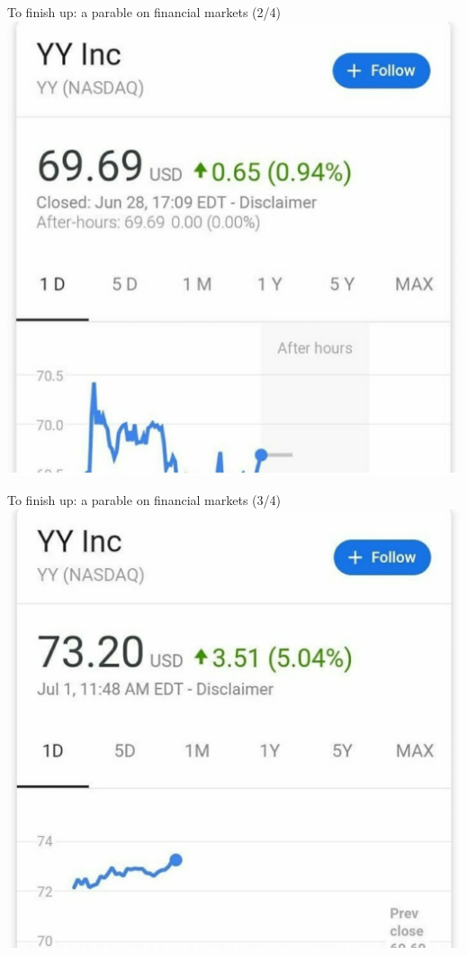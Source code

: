 \documentclass[english,10pt]{beamer}
\theoremstyle{definition}
\begin{document}
\begin{frame}{To finish up: a parable on financial markets (2/4)}
	\centering \includegraphics[width=0.6\paperwidth]{pics/yy2}
\end{frame}


\begin{frame}{To finish up: a parable on financial markets (3/4)}
	\centering \includegraphics[width=0.6\paperwidth]{pics/yy3}
\end{frame}
\end{document}
